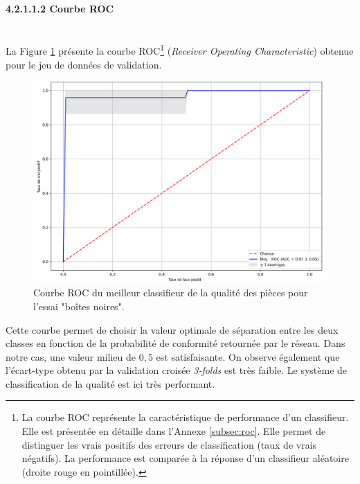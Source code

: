 \paragraph{4.2.1.1.2 Courbe ROC} \mbox{} \\
La Figure \ref{fig:roc_result} présente la courbe ROC\footnote{La courbe ROC représente la caractéristique de performance d'un classifieur. Elle est présentée en détaille dans l'Annexe \ref{subsec:roc}. Elle permet de distinguer les vrais positifs des erreurs de classification (taux de vrais négatifs). La performance est comparée à la réponse d'un classifieur aléatoire (droite rouge en pointillée).} (\textit{Receiver Operating Characteristic}) obtenue pour le jeu de données de validation.

\begin{figure}[bthp]
	\centering
	\includegraphics[width=\textwidth,height=\textheight,keepaspectratio]{../Chap4/Figures/roc_images_all_224_3cams_densenet_conv4_PCA20.png}
	\caption{Courbe ROC du meilleur classifieur de la qualité des pièces pour l'essai "boîtes noires".}
	\label{fig:roc_result}
\end{figure}

Cette courbe permet de choisir la valeur optimale de séparation entre les deux classes en fonction de la probabilité de conformité retournée par le réseau.
Dans notre cas, une valeur milieu de $0,5$ est satisfaisante.
On observe également que l'écart-type obtenu par la validation croisée \textit{3-folds} est très faible.
Le système de classification de la qualité est ici très performant. 

